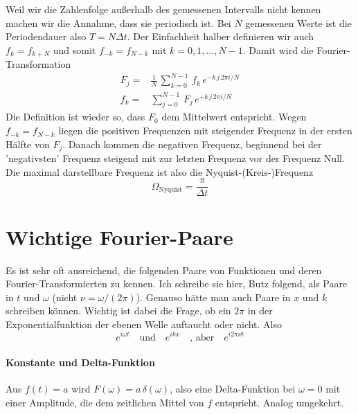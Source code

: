 Weil wir die Zahlenfolge außerhalb des gemessenen Intervalls nicht kennen machen wir die Annahme, dass sie periodisch ist. Bei $N$ gemessenen Werte ist die Periodendauer also $T = N \Delta t$. Der Einfachheit halber definieren wir auch $f_k = f_{k + N}$ und somit $f_{-k} = f_{N - k}$ mit $k= 0, 1, \dots, N-1$. Damit wird die Fourier-Transformation
\begin{align}
 F_j = & \frac{1}{N} \, \sum_{k=0}^{N-1} \, f_k \, e^{- k \, j \, 2 \pi i / N } \\
  f_k = &  \sum_{j=0}^{N-1} \, F_j \, e^{+ k \,  j \, 2 \pi i / N } 
\end{align}
Die Definition ist wieder so, dass $F_0$ dem Mittelwert entspricht. Wegen $f_{-k} = f_{N - k}$ liegen die positiven Frequenzen mit steigender Frequenz in der ersten Hälfte von $F_j$. Danach kommen die negativen Frequenz, beginnend bei der 'negativsten' Frequenz steigend mit zur letzten Frequenz vor der Frequenz Null. Die maximal darstellbare Frequenz ist also die Nyquist-(Kreis-)Frequenz
\begin{equation}
\Omega_\text{Nyquist} = \frac{\pi}{\Delta t}
\end{equation}


\section{Wichtige Fourier-Paare}

Es ist sehr oft ausreichend, die folgenden Paare von Funktionen und deren Fourier-Transformierten zu kennen. Ich schreibe sie hier, Butz folgend, als Paare in $t$ und $\omega$ (nicht $\nu = \omega / (2 \pi)$). Genauso hätte man auch Paare in $x$ und $k$ schreiben können. Wichtig ist dabei die Frage, ob ein $2 \pi$ in der Exponentialfunktion der ebenen Welle auftaucht oder nicht. Also
\begin{equation}
e^{i \omega t} \quad \text{und} \quad e^{i k x} \quad \text{, aber} \quad 
e^{i 2 \pi \nu t}
\end{equation}

\paragraph{Konstante und Delta-Funktion} Aus $f(t) = a$ wird $F(\omega) = a \, \delta(\omega)$, also eine Delta-Funktion bei $\omega = 0$ mit einer Amplitude, die dem zeitlichen Mittel von $f$ entspricht. Analog umgekehrt.

